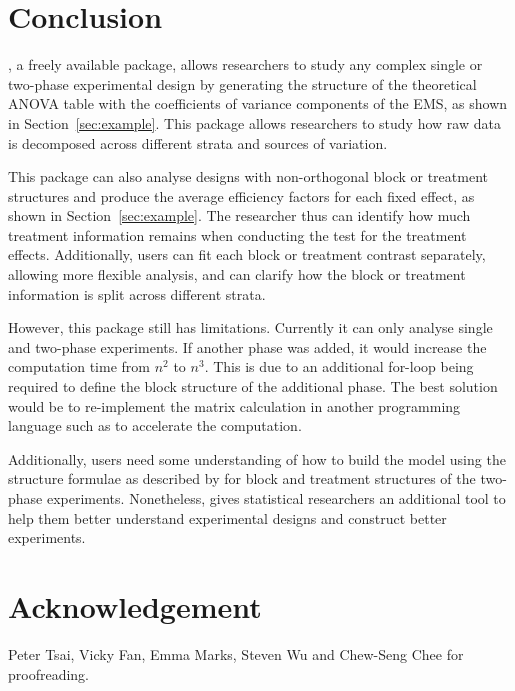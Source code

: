 \documentclass[article]{jss}
\begin{document}
\section[Conclusion]{Conclusion}
, a freely available  package, allows researchers to study any complex single or two-phase experimental design by generating the structure of the theoretical ANOVA table with the coefficients of variance components of the EMS, as shown in Section~\ref{sec:example}. This package allows researchers to study how raw data is decomposed across different strata and sources of variation.

This package can also analyse designs with non-orthogonal block or treatment structures and produce the average efficiency factors for each fixed effect, as shown in Section~\ref{sec:example}. The researcher thus can identify how much treatment information remains when conducting the test for the treatment effects. Additionally, users can fit each block or treatment contrast separately, allowing more flexible analysis, and can clarify how the block or treatment information is split across different strata.

However, this package still has limitations. Currently it can only analyse single and two-phase experiments. If another phase was added, it would increase the computation time from $n^2$ to $n^3$. This is due to an additional for-loop being required to define the block structure of the additional phase. The best solution would be to re-implement the matrix calculation in another programming language such as  to accelerate the computation.

Additionally, users need some understanding of how to build the model using the structure formulae as described by \cite{Wilkinson1973} for block and treatment structures of the two-phase experiments. Nonetheless,  gives statistical researchers an additional tool to help them better understand experimental designs and construct better experiments.

\section*{Acknowledgement}
Peter Tsai, Vicky Fan, Emma Marks, Steven Wu and Chew-Seng Chee for proofreading.


\end{document}
